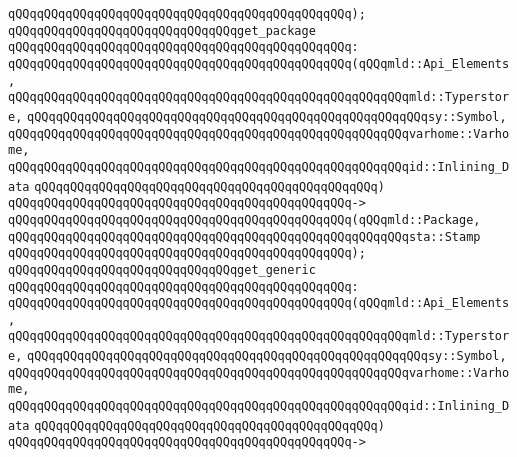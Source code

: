 \verb|qQQqqQQqqQQqqQQqqQQqqQQqqQQqqQQqqQQqqQQqqQQqqQQq);|\newline
\newline
\verb|qQQqqQQqqQQqqQQqqQQqqQQqqQQqqQQqget_package|\newline
\verb|qQQqqQQqqQQqqQQqqQQqqQQqqQQqqQQqqQQqqQQqqQQqqQQq:|\newline
\verb|qQQqqQQqqQQqqQQqqQQqqQQqqQQqqQQqqQQqqQQqqQQqqQQq(qQQqmld::Api_Elements,|\newline
\verb|qQQqqQQqqQQqqQQqqQQqqQQqqQQqqQQqqQQqqQQqqQQqqQQqqQQqqQQqmld::Typerstore,|\newline
\verb|qQQqqQQqqQQqqQQqqQQqqQQqqQQqqQQqqQQqqQQqqQQqqQQqqQQqqQQqsy::Symbol,|\newline
\verb|qQQqqQQqqQQqqQQqqQQqqQQqqQQqqQQqqQQqqQQqqQQqqQQqqQQqqQQqvarhome::Varhome,|\newline
\verb|qQQqqQQqqQQqqQQqqQQqqQQqqQQqqQQqqQQqqQQqqQQqqQQqqQQqqQQqid::Inlining_Data|\newline
\verb|qQQqqQQqqQQqqQQqqQQqqQQqqQQqqQQqqQQqqQQqqQQqqQQq)|\newline
\verb|qQQqqQQqqQQqqQQqqQQqqQQqqQQqqQQqqQQqqQQqqQQqqQQq->|\newline
\verb|qQQqqQQqqQQqqQQqqQQqqQQqqQQqqQQqqQQqqQQqqQQqqQQq(qQQqmld::Package,|\newline
\verb|qQQqqQQqqQQqqQQqqQQqqQQqqQQqqQQqqQQqqQQqqQQqqQQqqQQqqQQqsta::Stamp|\newline
\verb|qQQqqQQqqQQqqQQqqQQqqQQqqQQqqQQqqQQqqQQqqQQqqQQq);|\newline
\newline
\verb|qQQqqQQqqQQqqQQqqQQqqQQqqQQqqQQqget_generic|\newline
\verb|qQQqqQQqqQQqqQQqqQQqqQQqqQQqqQQqqQQqqQQqqQQqqQQq:|\newline
\verb|qQQqqQQqqQQqqQQqqQQqqQQqqQQqqQQqqQQqqQQqqQQqqQQq(qQQqmld::Api_Elements,|\newline
\verb|qQQqqQQqqQQqqQQqqQQqqQQqqQQqqQQqqQQqqQQqqQQqqQQqqQQqqQQqmld::Typerstore,|\newline
\verb|qQQqqQQqqQQqqQQqqQQqqQQqqQQqqQQqqQQqqQQqqQQqqQQqqQQqqQQqsy::Symbol,|\newline
\verb|qQQqqQQqqQQqqQQqqQQqqQQqqQQqqQQqqQQqqQQqqQQqqQQqqQQqqQQqvarhome::Varhome,|\newline
\verb|qQQqqQQqqQQqqQQqqQQqqQQqqQQqqQQqqQQqqQQqqQQqqQQqqQQqqQQqid::Inlining_Data|\newline
\verb|qQQqqQQqqQQqqQQqqQQqqQQqqQQqqQQqqQQqqQQqqQQqqQQq)|\newline
\verb|qQQqqQQqqQQqqQQqqQQqqQQqqQQqqQQqqQQqqQQqqQQqqQQq->|\newline
